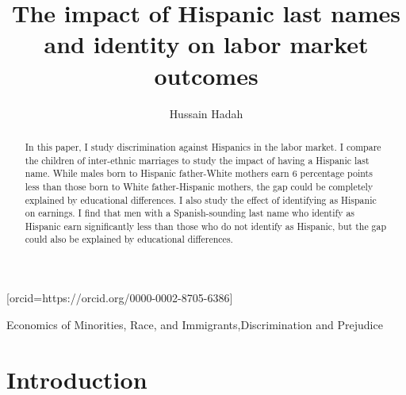 \documentclass[a4paper,fleqn]{cas-sc}
\begin{document}
\let\WriteBookmarks\relax
\def\floatpagepagefraction{1}
\def\textpagefraction{.001}



\title [mode = title]{The impact of Hispanic last names and identity on labor market outcomes}

\author[]{Hussain Hadah}[orcid=https://orcid.org/0000-0002-8705-6386]





\begin{abstract}
In this paper, I study discrimination against Hispanics in the labor market. I compare the children of inter-ethnic marriages to study the impact of having a Hispanic last name. While males born to Hispanic father-White mothers earn 6 percentage points less than those born to White father-Hispanic mothers, the gap could be completely explained by educational differences. I also study the effect of identifying as Hispanic on earnings. I find that men with a Spanish-sounding last name who identify as Hispanic earn significantly less than those who do not identify as Hispanic, but the gap could also be explained by educational differences.
\end{abstract}

\begin{keywords}
 Economics of Minorities, Race, and Immigrants\sep Discrimination and Prejudice\\
\end{keywords}


\maketitle


\section{Introduction}\label{sec:intro}
\end{document}
